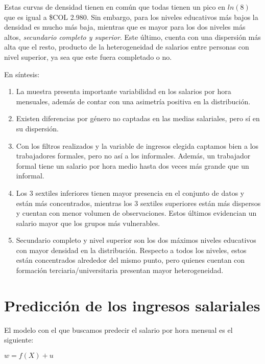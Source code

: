 \documentclass[11pt,oneside]{article}
\begin{document}
	Estas curvas de densidad tienen en común que todas tienen un pico en $ln(8)$ que es igual a \$COL 2.980. Sin embargo, para los niveles educativos más bajos la densidad es mucho más baja, mientras que es mayor para los dos niveles más altos, \textit{secundario completo y superior}. Este último, cuenta con una dispersión más alta que el resto, producto de la heterogeneidad de salarios entre personas con nivel superior, ya sea que este fuera completado o no. 
	
	En síntesis:
	\begin{enumerate}
		\item La muestra presenta importante variabilidad en los salarios por hora mensuales, además de contar con una asimetría positiva en la distribución.
		\item Existen diferencias por género no captadas en las medias salariales, pero sí en su dispersión.
		\item Con los filtros realizados y la variable de ingresos elegida captamos bien a los trabajadores formales, pero no así a los informales. Además, un trabajador formal tiene un salario por hora medio hasta dos veces más grande que un informal. 
		\item Los 3 sextiles inferiores tienen mayor presencia en el conjunto de datos y están más concentrados, mientras los 3 sextiles superiores están más dispersos y cuentan con menor volumen de observaciones. Estos últimos evidencian un salario mayor que los grupos más vulnerables.
		\item Secundario completo y nivel superior son los dos máximos niveles educativos con mayor densidad en la distribución. Respecto a todos los niveles, estos están concentrados alrededor del mismo punto, pero quienes cuentan con formación terciaria/universitaria presentan mayor heterogeneidad. 
	\end{enumerate}
	
	
	
	
	
	\section{Predicción de los ingresos salariales}
	
	El modelo con el que buscamos predecir el salario por hora mensual es el siguiente:
	
	\begin{center}
		$w = f(X) + u$
	\end{center}
	
\end{document}
